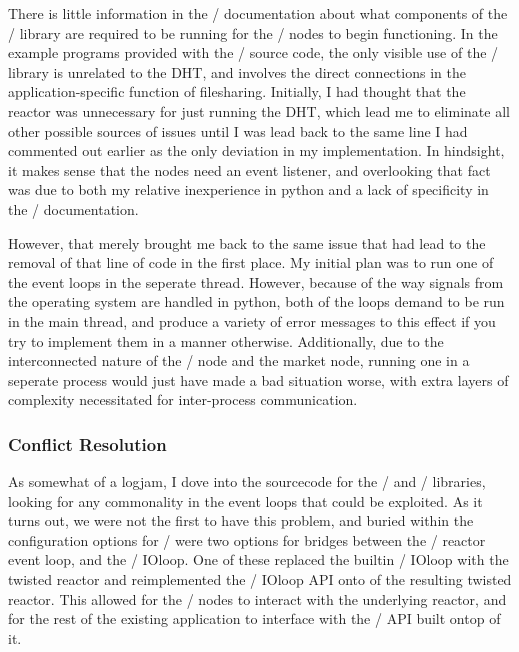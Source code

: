 \documentclass[12pt,twocolumn]{article}
\begin{document}
There is little information in the \Entangled/ documentation about what components of the \Twisted/ library are required to be running for the \Entangled/ nodes to begin functioning. In the example programs provided with the \Entangled/ source code, the only visible use of the \Twisted/ library is unrelated to the DHT, and involves the direct connections in the application-specific function of filesharing. Initially, I had thought that the reactor was unnecessary for just running the DHT, which lead me to eliminate all other possible sources of issues until I was lead back to the same line I had commented out earlier as the only deviation in my implementation. In hindsight, it makes sense that the nodes need an event listener, and overlooking that fact was due to both my relative inexperience in python and a lack of specificity in the \Entangled/ documentation.

However, that merely brought me back to the same issue that had lead to the removal of that line of code in the first place. My initial plan was to run one of the event loops in the seperate thread. However, because of the way signals from the operating system are handled in python, both of the loops demand to be run in the main thread, and produce a variety of error messages to this effect if you try to implement them in a manner otherwise. Additionally, due to the interconnected nature of the \Entangled/ node and the market node, running one in a seperate process would just have made a bad situation worse, with extra layers of complexity necessitated for inter-process communication.

\subsubsection{Conflict Resolution}
As somewhat of a logjam, I dove into the sourcecode for the \Tornado/ and \Twisted/ libraries, looking for any commonality in the event loops that could be exploited. As it turns out, we were not the first to have this problem, and buried within the configuration options for \Tornado/ were two options for bridges between the \Twisted/ reactor event loop, and the \Tornado/ IOloop. One of these replaced the builtin \Tornado/ IOloop with the twisted reactor and reimplemented the \Tornado/ IOloop API onto of the resulting twisted reactor. This allowed for the \Entangled/ nodes to interact with the underlying reactor, and for the rest of the existing application to interface with the \Tornado/ API built ontop of it.
\end{document}
